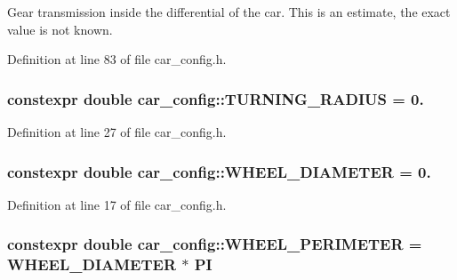 Gear transmission inside the differential of the car. This is an estimate, the exact value is not known. 



Definition at line 83 of file car\+\_\+config.\+h.

\subsubsection[{\texorpdfstring{T\+U\+R\+N\+I\+N\+G\+\_\+\+R\+A\+D\+I\+US}{TURNING_RADIUS}}]{\setlength{\rightskip}{0pt plus 5cm}constexpr double car\+\_\+config\+::\+T\+U\+R\+N\+I\+N\+G\+\_\+\+R\+A\+D\+I\+US = 0.}\hypertarget{namespacecar__config_afe308ba7ae07f7bd5af7e79a095101a9}{}\label{namespacecar__config_afe308ba7ae07f7bd5af7e79a095101a9}


Definition at line 27 of file car\+\_\+config.\+h.

\subsubsection[{\texorpdfstring{W\+H\+E\+E\+L\+\_\+\+D\+I\+A\+M\+E\+T\+ER}{WHEEL_DIAMETER}}]{\setlength{\rightskip}{0pt plus 5cm}constexpr double car\+\_\+config\+::\+W\+H\+E\+E\+L\+\_\+\+D\+I\+A\+M\+E\+T\+ER = 0.}\hypertarget{namespacecar__config_a6f064e331d6d85d46028dfbe75f063dd}{}\label{namespacecar__config_a6f064e331d6d85d46028dfbe75f063dd}


Definition at line 17 of file car\+\_\+config.\+h.

\subsubsection[{\texorpdfstring{W\+H\+E\+E\+L\+\_\+\+P\+E\+R\+I\+M\+E\+T\+ER}{WHEEL_PERIMETER}}]{\setlength{\rightskip}{0pt plus 5cm}constexpr double car\+\_\+config\+::\+W\+H\+E\+E\+L\+\_\+\+P\+E\+R\+I\+M\+E\+T\+ER = {\bf W\+H\+E\+E\+L\+\_\+\+D\+I\+A\+M\+E\+T\+ER} $\ast$ {\bf PI}}\hypertarget{namespacecar__config_a46fe00906da07d2e030b586a634cd907}{}\label{namespacecar__config_a46fe00906da07d2e030b586a634cd907}


